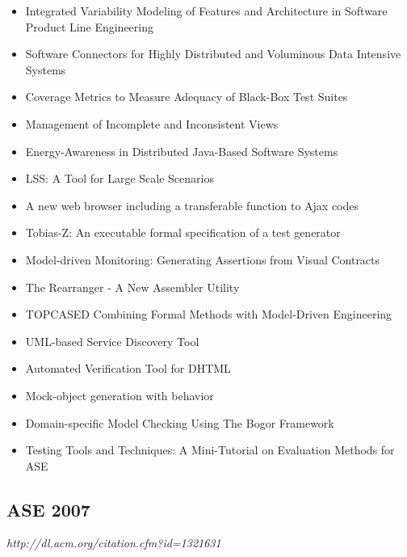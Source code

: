 {\begin{itemize}[itemsep=-1ex]
  \item Integrated Variability Modeling of Features and Architecture in Software Product Line Engineering
  \item Software Connectors for Highly Distributed and Voluminous Data Intensive Systems
  \item Coverage Metrics to Measure Adequacy of Black-Box Test Suites
  \item Management of Incomplete and Inconsistent Views
  \item Energy-Awareness in Distributed Java-Based Software Systems
  \item LSS: A Tool for Large Scale Scenarios
  \item A new web browser including a transferable function to Ajax codes
  \item Tobias-Z: An executable formal specification of a test generator
  \item Model-driven Monitoring: Generating Assertions from Visual Contracts
  \item The Rearranger - A New Assembler Utility
  \item TOPCASED Combining Formal Methods with Model-Driven Engineering
  \item UML-based Service Discovery Tool
  \item Automated Verification Tool for DHTML
  \item Mock-object generation with behavior
  \item Domain-specific Model Checking Using The Bogor Framework
  \item Testing Tools and Techniques: A Mini-Tutorial on Evaluation Methods for ASE
\end{itemize}
}

\subsection{ASE 2007}

{\small \em http://dl.acm.org/citation.cfm?id=1321631}

